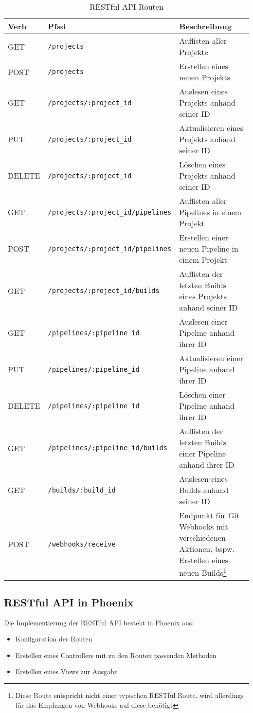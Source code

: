 \begin{table}[H]
  \footnotesize
  \begin{tabularx}{\textwidth}{| l | l | X |}
    \hline
    \textbf{Verb} & \textbf{Pfad} & \textbf{Beschreibung} \\ \hline
    GET & {\scriptsize \texttt{/projects}} & Auflisten aller Projekte \\ \hline
    POST & {\scriptsize \texttt{/projects}} & Erstellen eines neuen Projekts \\ \hline
    GET & {\scriptsize \texttt{/projects/:project\_id}} & Auslesen eines Projekts anhand seiner ID \\ \hline
    PUT & {\scriptsize \texttt{/projects/:project\_id}} & Aktualisieren eines Projekts anhand seiner ID \\ \hline
    DELETE & {\scriptsize \texttt{/projects/:project\_id}} & Löschen eines Projekts anhand seiner ID \\ \hline
    GET & {\scriptsize \texttt{/projects/:project\_id/pipelines}} & Auflisten aller Pipelines in einem Projekt \\ \hline
    POST & {\scriptsize \texttt{/projects/:project\_id/pipelines}} & Erstellen einer neuen Pipeline in einem Projekt \\ \hline
    GET & {\scriptsize \texttt{/projects/:project\_id/builds}} & Auflisten der letzten Builds eines Projekts anhand seiner ID \\ \hline
    GET & {\scriptsize \texttt{/pipelines/:pipeline\_id}} & Auslesen einer Pipeline anhand ihrer ID \\ \hline
    PUT & {\scriptsize \texttt{/pipelines/:pipeline\_id}} & Aktualisieren einer Pipeline anhand ihrer ID \\ \hline
    DELETE & {\scriptsize \texttt{/pipelines/:pipeline\_id}} & Löschen einer Pipeline anhand ihrer ID \\ \hline
    GET & {\scriptsize \texttt{/pipelines/:pipeline\_id/builds}} & Auflisten der letzten Builds einer Pipeline anhand ihrer ID \\ \hline
    GET & {\scriptsize \texttt{/builds/:build\_id}} & Auslesen eines Builds anhand seiner ID \\
    \hline\hline
    POST & {\scriptsize \texttt{/webhooks/receive}} & Endpunkt für Git Webhooks mit verschiedenen Aktionen, bspw. Erstellen eines neuen Builds\footnote{Diese Route entspricht nicht einer typischen RESTful Route, wird allerdings für das Empfangen von Webhooks auf diese benötigt} \\
    \hline
  \end{tabularx}
  \caption{RESTful API Routen}
  \label{tab:rest-routes}
\end{table}

\subsection{RESTful API in Phoenix}

Die Implementierung der RESTful API besteht in Phoenix aus:

\begin{itemize}
  \item Konfiguration der Routen
  \item Erstellen eines Controllers mit zu den Routen passenden Methoden
  \item Erstellen eines Views zur Ausgabe
\end{itemize}
